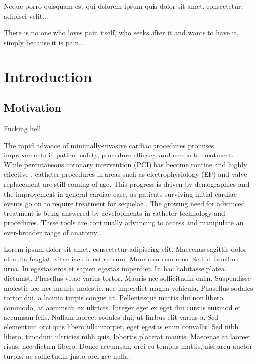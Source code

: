 \begin{savequote}[8cm]
\textlatin{Neque porro quisquam est qui dolorem ipsum quia dolor sit amet, consectetur, adipisci velit...}

There is no one who loves pain itself, who seeks after it and wants to have it, simply because it is pain...
\end{savequote}

\chapter{\label{ch:1-intro}Introduction} 

\minitoc

\section{Motivation}
Fucking hell

The rapid advance of minimally-invasive cardiac procedures promises improvements in patient safety, procedure efficacy, and access to treatment.  While percutaneous coronary intervention (PCI) has become routine and highly effective \cite{bravata_systematic_2007}, catheter procedures in areas such as electrophysiology (EP) and valve replacement are still coming of age.  This progress is driven by demographics and the improvement in general cardiac care, as patients surviving initial cardiac events go on to require treatment for sequelae \cite{foot_demographics_2000}.  The growing need for advanced treatment is being answered by developments in catheter technology and procedures.  These tools are continually advancing to access and manipulate an ever-broader range of anatomy \cite{sousa_new_2005}.

Lorem ipsum dolor sit amet, consectetur adipiscing elit. Maecenas sagittis dolor at nulla feugiat, vitae iaculis est rutrum. Mauris eu sem eros. Sed id faucibus urna. In egestas eros et sapien egestas imperdiet. In hac habitasse platea dictumst. Phasellus vitae varius tortor. Mauris nec sollicitudin enim. Suspendisse molestie leo nec mauris molestie, nec imperdiet magna vehicula. Phasellus sodales tortor dui, a lacinia turpis congue at. Pellentesque mattis dui non libero commodo, at accumsan ex ultrices. Integer eget ex eget dui cursus euismod et accumsan felis. Nullam laoreet sodales dui, ut finibus elit varius a. Sed elementum orci quis libero ullamcorper, eget egestas enim convallis. Sed nibh libero, tincidunt ultricies nibh quis, lobortis placerat mauris. Maecenas at laoreet risus, nec dictum libero. Donec accumsan, orci eu tempus mattis, nisl arcu auctor turpis, ac sollicitudin justo orci nec nulla.


